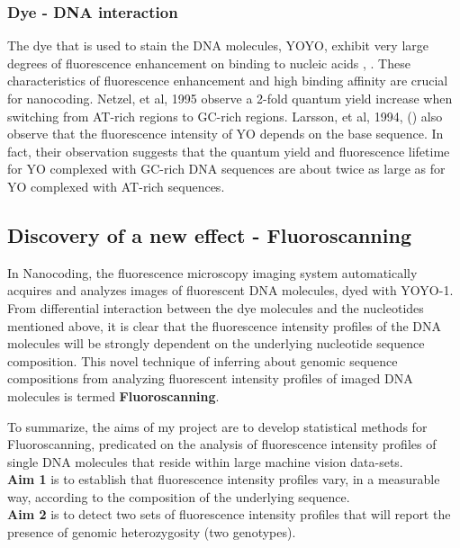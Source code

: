 \subsubsection*{Dye - DNA interaction} 
The dye that is used to stain the DNA molecules, YOYO, exhibit very large degrees of fluorescence enhancement on binding to nucleic acids \cite{Rye_etal_1992_NAR}, \cite{Lee_etal_1986_Cytometry}. These  characteristics of fluorescence enhancement and  high binding affinity are crucial for nanocoding. Netzel, et al, 1995 \cite{Netzel_etal_1995_JPC} observe a 2-fold quantum yield increase when switching from AT-rich regions to GC-rich regions. Larsson, et al, 1994, (\cite{Larsson_etal_1994_JACS}) also observe that the fluorescence intensity of YO depends on the base sequence. In fact, their observation suggests that the quantum yield and fluorescence lifetime for YO complexed with GC-rich DNA sequences are about twice as large as for YO complexed with AT-rich sequences. 

\subsection{Discovery of a new effect - Fluoroscanning} \label{Aims}
In Nanocoding, the fluorescence microscopy imaging system automatically acquires and analyzes images of fluorescent DNA molecules, dyed with YOYO-1. From differential interaction between the dye molecules and the nucleotides mentioned above, it is clear that the fluorescence intensity profiles of the DNA molecules will be strongly dependent on the underlying nucleotide sequence composition. This novel technique of inferring about genomic sequence compositions from analyzing fluorescent intensity profiles of imaged DNA molecules is termed {\bf{Fluoroscanning}}. 

To summarize, the aims of my project are to develop statistical methods for Fluoroscanning, predicated on the analysis of fluorescence intensity profiles of single DNA molecules that reside within large machine vision data-sets.\\
\noindent
{\bf{Aim 1}} is to establish that fluorescence intensity profiles vary, in a measurable way, according to the composition of the underlying sequence. \\
\noindent
{\bf{Aim 2}} is to detect two sets of fluorescence intensity profiles that will report the presence of genomic heterozygosity (two genotypes).



